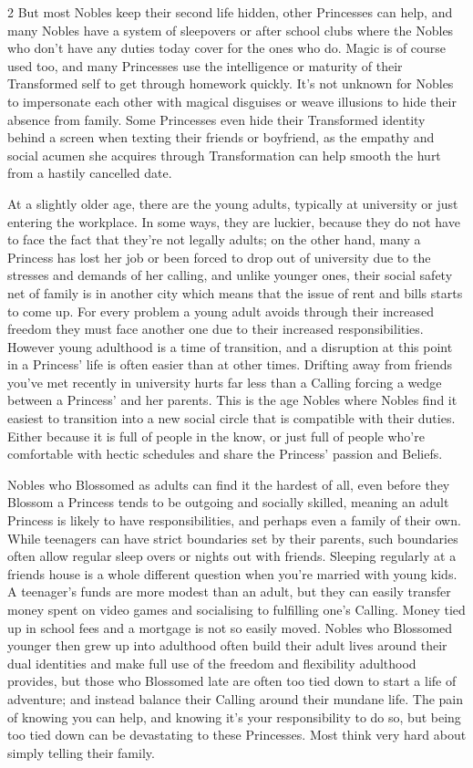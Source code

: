 \begin{multicols}{2}
But most Nobles keep their second life hidden, other Princesses can help, and many Nobles have a system of sleepovers or after school clubs where the Nobles who don't have any duties today cover for the ones who do. Magic is of course used too, and many Princesses use the intelligence or maturity of their Transformed self to get through homework quickly. It's not unknown for Nobles to impersonate each other with magical disguises or weave illusions to hide their absence from family. Some Princesses even hide their Transformed identity behind a screen when texting their friends or boyfriend, as the empathy and social acumen she acquires through Transformation can help smooth the hurt from a hastily cancelled date. 

At a slightly older age, there are the young adults, typically at university or just entering the workplace. In some ways, they are luckier, because they do not have to face the fact that they’re not legally adults; on the other hand, many a Princess has lost her job or been forced to drop out of university due to the stresses and demands of her calling, and unlike younger ones, their social safety net of family is in another city which means that the issue of rent and bills starts to come up. For every problem a young adult avoids through their increased freedom they must face another one due to their increased responsibilities. However young adulthood is a time of transition, and a disruption at this point in a Princess' life is often easier than at other times. Drifting away from friends you've met recently in university hurts far less than a Calling forcing a wedge between a Princess' and her parents. This is the age Nobles where Nobles find it easiest to transition into a new social circle that is compatible with their duties. Either because it is full of people in the know, or just full of people who're comfortable with hectic schedules and share the Princess' passion and Beliefs. 

Nobles who Blossomed as adults can find it the hardest of all, even before they Blossom a Princess tends to be outgoing and socially skilled, meaning an adult Princess is likely to have responsibilities, and perhaps even a family of their own. While teenagers can have strict boundaries set by their parents, such boundaries often allow regular sleep overs or nights out with friends. Sleeping regularly at a friends house is a whole different question when you're married with young kids. A teenager's funds are more modest than an adult, but they can easily transfer money spent on video games and socialising to fulfilling one's Calling. Money tied up in school fees and a mortgage is not so easily moved. Nobles who Blossomed younger then grew up into adulthood often build their adult lives around their dual identities and make full use of the freedom and flexibility adulthood provides, but those who Blossomed late are often too tied down to start a life of adventure; and instead balance their Calling around their mundane life. The pain of knowing you can help, and knowing it's your responsibility to do so, but being too tied down can be devastating to these Princesses. Most think very hard about simply telling their family. 


\end{multicols}
